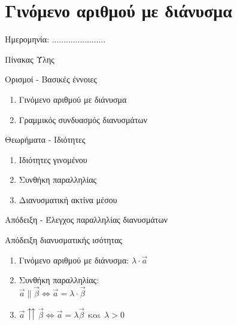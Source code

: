 \documentclass[internet]{frontisthrio}
\newcommand{\myitem}{\stepcounter{enumi}\item[\raisebox{0.5mm}{\faExclamationTriangle}\ \Large$\square$]}
\begin{document}
\section{Γινόμενο αριθμού με διάνυσμα}
\begin{flushright}
\faCalendar* Ημερομηνία: .......................
\end{flushright}
\begin{mybox}[mysubtitle]{Πίνακας Ύλης}
\begin{tcbraster}[raster columns=2,raster equal height]
\begin{myleftbox}{Ορισμοί - Βασικές έννοιες\ \ \faBook}
\begin{enumerate}[itemsep=0mm]
\item Γινόμενο αριθμού με διάνυσμα
\item Γραμμικός συνδυασμός διανυσμάτων
\end{enumerate}
\end{myleftbox}
\begin{myrightbox}{Θεωρήματα - Ιδιότητες\ \ \faTools}
\begin{enumerate}[itemsep=0mm]
\item Ιδιότητες γινομένου
\item Συνθήκη παραλληλίας
\item Διανυσματική ακτίνα μέσου
\end{enumerate}
\end{myrightbox}
\end{tcbraster}
\begin{multicols}{2}
\begin{todolist}[itemsep=0mm]
\myitem Απόδειξη - Έλεγχος παραλληλίας διανυσμάτων
\item Απόδειξη διανυσματικής ισότητας
\item 
\end{todolist}
\end{multicols}
\begin{multicols}{2}
\begin{enumerate}[itemsep=0mm]
\item Γινόμενο αριθμού με διάνυσμα: $\lambda\cdot \vec{a}$
\item Συνθήκη παραλληλίας:\\$\vec{a}\parallel\vec{\beta}\Leftrightarrow \vec{a}=\lambda\cdot\vec{\beta}$
\item $\vec{a}\upuparrows\vec{\beta}\Leftrightarrow \vec{a}=\lambda\vec{\beta}\ \ \textrm{και}\ \ \lambda>0$

\end{enumerate}
\end{multicols}
\end{mybox}
\end{document}
